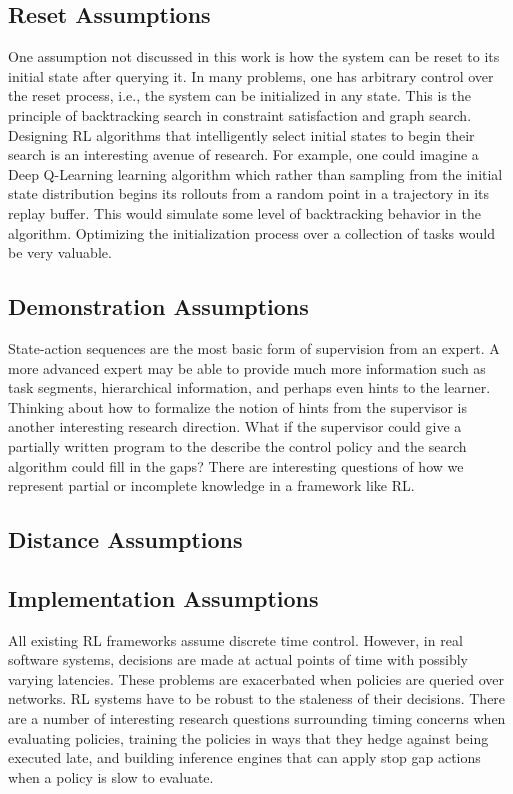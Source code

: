 \subsection*{Reset Assumptions}
One assumption not discussed in this work is how the system can be reset to its initial state after querying it. In many problems, one has arbitrary control over the reset process, i.e., the system can be initialized in any state.
This is the principle of backtracking search in constraint satisfaction and graph search. 
Designing RL algorithms that intelligently select initial states to begin their search is an interesting avenue of research.
For example, one could imagine a Deep Q-Learning learning algorithm which rather than sampling from the initial state distribution begins its rollouts from a random point in a trajectory in its replay buffer.
This would simulate some level of backtracking behavior in the algorithm.
Optimizing the initialization process over a collection of tasks would be very valuable.

\subsection*{Demonstration Assumptions}
State-action sequences are the most basic form of supervision from an expert. 
A more advanced expert may be able to provide much more information such as task segments, hierarchical information, and perhaps even hints to the learner. 
Thinking about how to formalize the notion of hints from the supervisor is another interesting research direction.
What if the supervisor could give a partially written program to the describe the control policy and the search algorithm could fill in the gaps?
There are interesting questions of how we represent partial or incomplete knowledge in a framework like RL.

\subsection*{Distance Assumptions}

\subsection*{Implementation Assumptions}
All existing RL frameworks assume discrete time control. However, in real software systems, decisions are made at actual points of time with possibly varying latencies. 
These problems are exacerbated when policies are queried over networks.
RL systems have to be robust to the staleness of their decisions.
There are a number of interesting research questions surrounding timing concerns when evaluating policies, training the policies in ways that they hedge against being executed late, and building inference engines that can apply stop gap actions when a policy is slow to evaluate.


